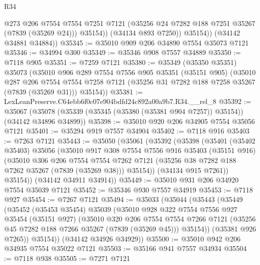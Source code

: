 \begin{lexlean}{R34}
\begin{coremodule}
                @273
                @206
                @7554
                @7554
                @7251
                @7121
                (@35256 @24 @7282 @188 @7251 @35267 (@7839 (@35269 @24)))
                @35154))
            (@34134 @893 @7250))
          @35154))
      (@34142 @34881 @34884))
@35345 := @35010 @909 @206 @34890 @7554 @35073 @7121
@35346 := @34994 @300
@35349 := @35346 @908 @7557 @34889
@35350 := @7118 @905
@35351 := @7259 @7121
@35380 := @35349
    (@35350 @35351)
    @35073
    (@35010
      @906
      @289
      @7554
      @7556
      @905
      @35351
      (@35151 @905)
      (@35010
        @287
        @206
        @7554
        @7554
        @7258
        @7121
        (@35256 @31 @7282 @188 @7258 @35267 (@7839 (@35269 @31)))
        @35154))
@35381 := LexLeanPreserve.C64ebb6f0c07e904bdfd24c892a00a9b7.R34.__rel_8
@35392 := @35067
    (@35078 (@35339 (@35345 (@35380 (@35381 @904 @7257)) @35154)) (@34142 @34896 @34899))
@35398 := @35010 @920 @206 @34905 @7554 @35056 @7121
@35401 := @35294 @919 @7557 @34904
@35402 := @7118 @916
@35403 := @7263 @7121
@35443 := @35050
    (@35061
      (@35392
        (@35398
          (@35401
            (@35402 @35403)
            @35056
            (@35010
              @917
              @308
              @7554
              @7556
              @916
              @35403
              (@35151 @916)
              (@35010
                @306
                @206
                @7554
                @7554
                @7262
                @7121
                (@35256 @38 @7282 @188 @7262 @35267 (@7839 (@35269 @38)))
                @35154))
            (@34134 @915 @7261))
          @35154))
      (@34142 @34911 @34914))
@35449 := @35010 @931 @206 @34920 @7554 @35039 @7121
@35452 := @35346 @930 @7557 @34919
@35453 := @7118 @927
@35454 := @7267 @7121
@35494 := @35033
    (@35044
      (@35443
        (@35449
          (@35452
            (@35453 @35454)
            @35039
            (@35010
              @928
              @322
              @7554
              @7556
              @927
              @35454
              (@35151 @927)
              (@35010
                @320
                @206
                @7554
                @7554
                @7266
                @7121
                (@35256 @45 @7282 @188 @7266 @35267 (@7839 (@35269 @45)))
                @35154))
            (@35381 @926 @7265))
          @35154))
      (@34142 @34926 @34929))
@35500 := @35010 @942 @206 @34935 @7554 @35022 @7121
@35503 := @35166 @941 @7557 @34934
@35504 := @7118 @938
@35505 := @7271 @7121

\end{coremodule}
\end{lexlean}
